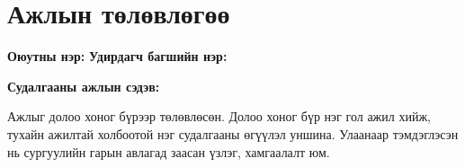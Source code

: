 \chapter*{Ажлын төлөвлөгөө}
\label{ch:plan}

\noindent\textbf{Оюутны нэр:} \authorShort \hfill \textbf{Удирдагч багшийн нэр:} \supervisorname

\noindent\textbf{Судалгааны ажлын сэдэв:} \titlename %

\vspace{0.2cm}

Ажлыг долоо хоног бүрээр төлөвлөсөн. Долоо хоног бүр нэг гол ажил хийж, тухайн ажилтай холбоотой нэг судалгааны өгүүлэл уншина. Улаанаар тэмдэглэсэн нь сургуулийн гарын авлагад заасан үзлэг, хамгаалалт юм.

